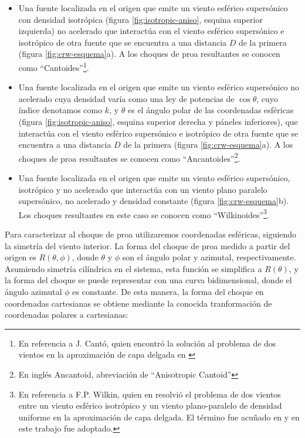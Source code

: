 \begin{itemize}
\item Una fuente localizada en el origen que emite un viento esférico supersónico con densidad isotrópica (figura \ref{fig:isotropic-aniso}, esquina superior izquierda) no acelerado que interactúa con el viento esférico supersónico e isotrópico de otra fuente que se encuentra a una distancia $D$ de la primera (figura \ref{fig:crw-esquema}a). A los choques de proa resultantes se conocen como ``Cantoides''\footnote{En referencia a J. Cantó, quien encontró la solución al problema de dos vientos en la aproximación de capa delgada en \citet{Canto:1996}}. 
\item  Una fuente localizada en el origen que emite un viento esférico supersónico no acelerado cuya densidad varía como una ley de potencias de $\cos\theta$, cuyo índice denotamos como $k$, y $\theta$ es el ángulo polar de las coordenadas esféricas (figura \ref{fig:isotropic-aniso}, esquina superior derecha y páneles inferiores), que interactúa con el viento esférico supersónico e isotrópico de otra fuente que se encuentra a una distancia $D$ de la primera (figura \ref{fig:crw-esquema}a). A los choques de proa resultantes se conocen como ``Ancantoides''\footnote{En inglés Ancantoid, abreviación de ``Anisotropic Cantoid''}.
\item Una fuente localizada en el origen que emite un viento esférico supersónico, isotrópico y no acelerado que interactúa con un viento plano paralelo supersónico, no acelerado y densidad constante (figura \ref{fig:crw-esquema}b). Los choques resultantes en este caso se conocen como ``Wilkinoides''\footnote{En referencia a F.P. Wilkin, quien en \citet{Wilkin:1996} resolvió el problema de dos vientos entre un viento esférico isotrópico y un viento plano-paralelo de densidad uniforme en la aproximación de capa delgada. El término fue acuñado en \citet{Cox:2012} y en este trabajo fue adoptado.}.
\end{itemize}
Para caracterizar al choque de proa utilizaremos coordenadas esféricas, siguiendo la simetría del viento interior. La forma del choque de proa medido a partir del origen es $R(\theta, \phi)$, donde $\theta$ y $\phi$ son el ángulo polar y azimutal, respectivamente. Asumiendo simetría cilíndrica en el sistema, esta función se simplifica a $R(\theta)$, y la forma del choque se puede representar con una curva bidimensional, donde el ángulo azimutal $\phi$ es constante. De esta manera, la forma del choque en coordenadas cartesianas se obtiene mediante la conocida tranformación de coordenadas polares a cartesianas:

